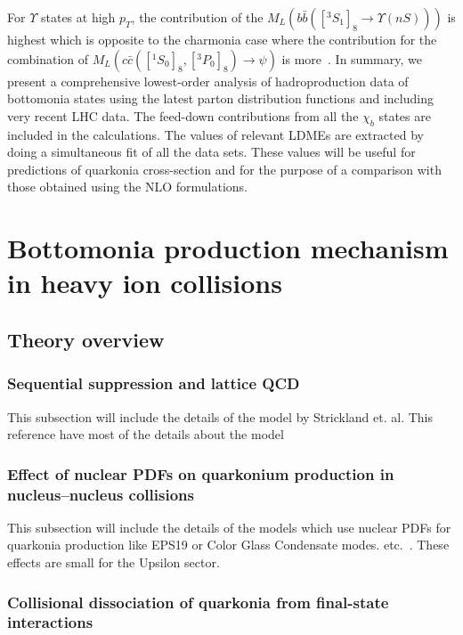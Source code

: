 \documentclass[review]{elsarticle}
\newcommand{\barb}{{\bar{b}}}
\newcommand{\barc}{{\bar{c}}}
\begin{document}
For $\Upsilon$ states at high  $p_T$, the contribution of the  
$M_{L}(b\barb([^3S_1]_{8}\rightarrow \Upsilon(nS)))$ is highest which is opposite to the charmonia 
case where the contribution for the combination of  $M_{L}(c\barc([^1S_0]_{8},[^3P_0]_{8})\rightarrow \psi)$ 
is more~\cite{Kumar:2016ojy}.
In summary, we present a comprehensive lowest-order analysis of hadroproduction data of bottomonia 
states using the latest parton distribution functions and including very recent LHC data. The feed-down
contributions from all the $\chi_{b}$ states are included in the calculations. The values of relevant LDMEs
are extracted by doing a simultaneous fit of all the data sets. These values will be useful for predictions
of quarkonia cross-section and for the purpose of a comparison with those obtained using the NLO formulations.


\section{Bottomonia production mechanism in heavy ion collisions}
\label{sec:Bottomonia_hi}

\subsection{Theory overview}

\subsubsection{Sequential suppression and lattice QCD}
{\color{red} This subsection will include the details of the model by Strickland et. al. This
reference have most of the details about the model~\cite{Mocsy:2013syh}}
              
              
\subsubsection{Effect of nuclear PDFs on quarkonium production in nucleus–nucleus collisions}
{\color{red} This subsection will include the details of the models which use nuclear PDFs for quarkonia production
like EPS19 or Color Glass Condensate modes. etc.~\cite{}. These effects are small for the Upsilon sector. }


\subsubsection{Collisional dissociation of quarkonia from final-state interactions}
\end{document}
